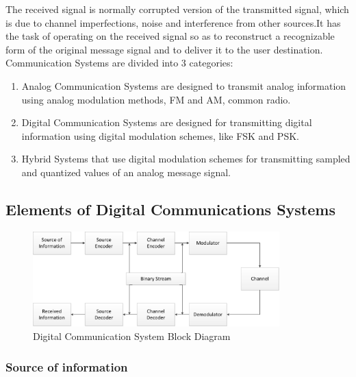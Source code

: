 The received signal is normally corrupted version of the transmitted signal,
which is due to channel imperfections, noise and interference from other
sources.It has the task of operating on the received signal so as to reconstruct
a recognizable form of the original message signal and to deliver it to the user
destination.\\

Communication Systems are divided into 3 categories:

\begin{enumerate}

  \item Analog Communication Systems are designed to transmit analog information
  using analog modulation methods, FM and AM, common radio.

  \item Digital Communication Systems are designed for transmitting digital
  information using digital modulation schemes, like FSK and PSK.

  \item Hybrid Systems that use digital modulation schemes for transmitting
  sampled and quantized values of an analog message signal.

\end{enumerate}

\subsection{Elements of Digital Communications Systems}

\begin{figure}[htbp]
    \centering
    \includegraphics[width=0.85\textwidth]{./figures/digicom_bd}
    \caption{ Digital Communication System Block Diagram
    \label{fig:digcombd}}
\end{figure}

\subsubsection{Source of information}

